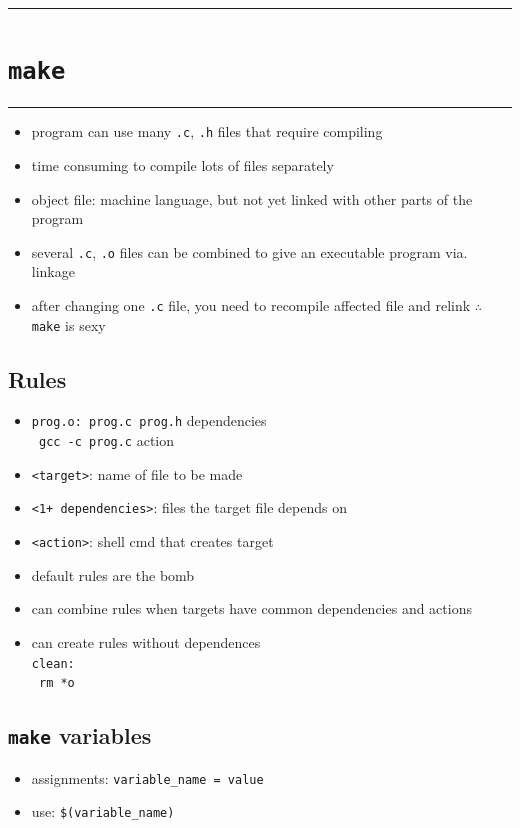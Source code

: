 \documentclass[10pt, multicolumn, a4paper]{article}
\begin{document}
\setcounter{section}{3}
\hrule
\section{\texttt{make}}
\hrule 

\begin{multicols}{2}
	\begin{itemize}
	\item program can use many \verb|.c|, \verb|.h| files that require compiling
	\item time consuming to compile lots of files separately
	\item object file: machine language, but not yet linked with other parts of the program
	\item several \verb|.c|,  \verb|.o| files can be combined to give an executable program via. linkage
	\item after changing one \verb|.c| file, you need to recompile affected file and relink $\therefore$ \verb|make| is sexy
	\end{itemize}
	\subsection*{Rules}
	\begin{itemize}
	\item \verb|prog.o: prog.c prog.h| \hspace*{5mm} dependencies 
		\\ \texttt{\hspace*{5mm} gcc -c prog.c} \hspace*{13mm} action
	\item \verb|<target>|: name of file to be made
	\item \verb|<1+ dependencies>|: files the target file depends on
	\item \verb|<action>|: shell cmd that creates target
	\item default rules are the bomb
	\item can combine rules when targets have common dependencies and actions
	\item can create rules without dependences
		\\ \verb|clean:| \\ \texttt{\hspace*{5mm} rm *o}
	\end{itemize}
	
	\newpage	
	
	\subsection*{\texttt{make} variables}
	\begin{itemize}
	\item assignments: \verb|variable_name = value|
	\item use: \verb|$(variable_name)|
	\end{itemize}

\end{multicols}
\end{document}

